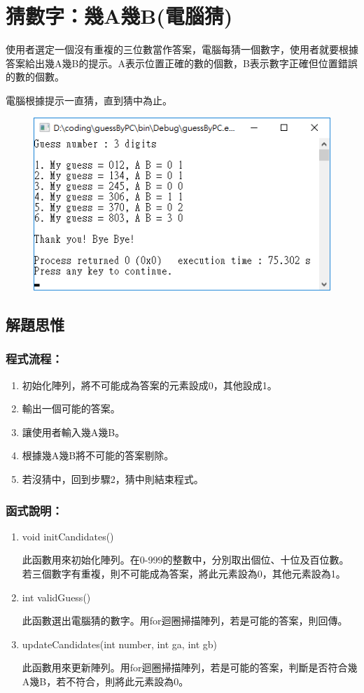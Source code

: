 \section{猜數字：幾A幾B(電腦猜)}

使用者選定一個沒有重複的三位數當作答案，電腦每猜一個數字，使用者就要根據答案給出幾A幾B的提示。A表示位置正確的數的個數，B表示數字正確但位置錯誤的數的個數。

電腦根據提示一直猜，直到猜中為止。
\begin{figure}[H]
	\centering
	\includegraphics{fig/PC}
\end{figure}
\subsection{解題思惟}

\subsubsection{程式流程：}
\begin{enumerate}
	\item 初始化陣列，將不可能成為答案的元素設成0，其他設成1。
	\item 輸出一個可能的答案。
	\item 讓使用者輸入幾A幾B。
	\item 根據幾A幾B將不可能的答案剔除。
	\item 若沒猜中，回到步驟2，猜中則結束程式。
\end{enumerate}

\subsubsection{函式說明：}
\begin{enumerate}
	\item void initCandidates()
	
	此函數用來初始化陣列。在0-999的整數中，分別取出個位、十位及百位數。若三個數字有重複，則不可能成為答案，將此元素設為0，其他元素設為1。
	
	\item int validGuess()
	
	此函數選出電腦猜的數字。用for迴圈掃描陣列，若是可能的答案，則回傳。
	
	\item updateCandidates(int number, int ga, int gb)
	
	此函數用來更新陣列。用for迴圈掃描陣列，若是可能的答案，判斷是否符合幾A幾B，若不符合，則將此元素設為0。
\end{enumerate}

